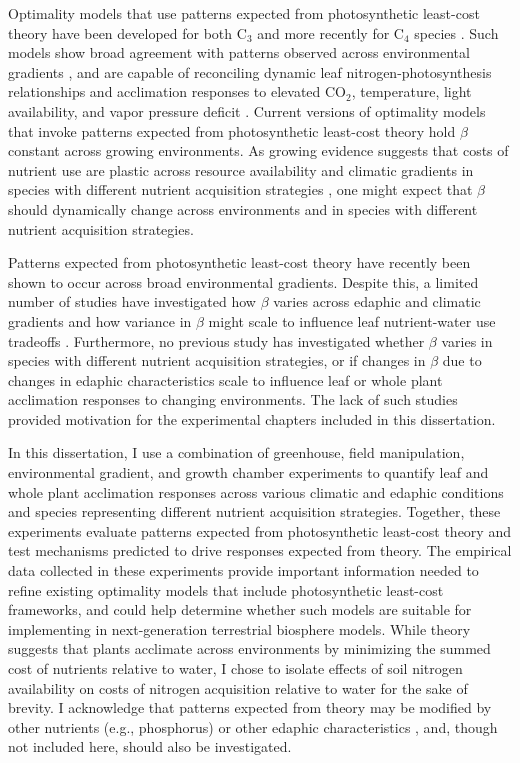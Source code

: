 Optimality models that use patterns expected from photosynthetic least-cost theory have been developed for both C$_3$  and more recently for C$_4$ species . Such models show broad agreement with patterns observed across environmental gradients , and are capable of reconciling dynamic leaf nitrogen-photosynthesis relationships and acclimation responses to elevated CO$_2$, temperature, light availability, and vapor pressure deficit . Current versions of optimality models that invoke patterns expected from photosynthetic least-cost theory hold $\beta$ constant across growing environments. As growing evidence suggests that costs of nutrient use are plastic across resource availability and climatic gradients in species with different nutrient acquisition strategies , one might expect that $\beta$ should dynamically change across environments and in species with different nutrient acquisition strategies.

Patterns expected from photosynthetic least-cost theory have recently been shown to occur across broad environmental gradients. Despite this, a limited number of studies have investigated how $\beta$ varies across edaphic and climatic gradients and how variance in $\beta$ might scale to influence leaf nutrient-water use tradeoffs . Furthermore, no previous study has investigated whether $\beta$ varies in species with different nutrient acquisition strategies, or if changes in $\beta$ due to changes in edaphic characteristics scale to influence leaf or whole plant acclimation responses to changing environments. The lack of such studies provided motivation for the experimental chapters included in this dissertation.

In this dissertation, I use a combination of greenhouse, field manipulation, environmental gradient, and growth chamber experiments to quantify leaf and whole plant acclimation responses across various climatic and edaphic conditions and species representing different nutrient acquisition strategies. Together, these experiments evaluate patterns expected from photosynthetic least-cost theory and test mechanisms predicted to drive responses expected from theory. The empirical data collected in these experiments provide important information needed to refine existing optimality models that include photosynthetic least-cost frameworks, and could help determine whether such models are suitable for implementing in next-generation terrestrial biosphere models. While theory suggests that plants acclimate across environments by minimizing the summed cost of nutrients relative to water, I chose to isolate effects of soil nitrogen availability on costs of nitrogen acquisition relative to water for the sake of brevity. I acknowledge that patterns expected from theory may be modified by other nutrients (e.g., phosphorus) or other edaphic characteristics , and, though not included here, should also be investigated.

